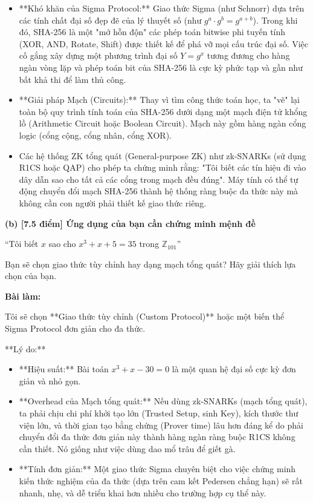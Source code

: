 \begin{itemize}
    \item **Khó khăn của Sigma Protocol:** Giao thức Sigma (như Schnorr) dựa trên các tính chất đại số đẹp đẽ của lý thuyết số (như $g^a \cdot g^b = g^{a+b}$). Trong khi đó, SHA-256 là một "mớ hỗn độn" các phép toán bitwise phi tuyến tính (XOR, AND, Rotate, Shift) được thiết kế để phá vỡ mọi cấu trúc đại số. Việc cố gắng xây dựng một phương trình đại số $Y = g^x$ tương đương cho hàng ngàn vòng lặp và phép toán bit của SHA-256 là cực kỳ phức tạp và gần như bất khả thi để làm thủ công.
    
    \item **Giải pháp Mạch (Circuits):** Thay vì tìm công thức toán học, ta "vẽ" lại toàn bộ quy trình tính toán của SHA-256 dưới dạng một mạch điện tử khổng lồ (Arithmetic Circuit hoặc Boolean Circuit). Mạch này gồm hàng ngàn cổng logic (cổng cộng, cổng nhân, cổng XOR).
    \item Các hệ thống ZK tổng quát (General-purpose ZK) như zk-SNARKs (sử dụng R1CS hoặc QAP) cho phép ta chứng minh rằng: "Tôi biết các tín hiệu đi vào dây dẫn sao cho tất cả các cổng trong mạch đều đúng". Máy tính có thể tự động chuyển đổi mạch SHA-256 thành hệ thống ràng buộc đa thức này mà không cần con người phải thiết kế giao thức riêng.
\end{itemize}

\textbf{(b) [7.5 điểm] Ứng dụng của bạn cần chứng minh mệnh đề}

``Tôi biết $x$ sao cho $x^3 + x + 5 = 35$ trong $\mathbb{Z}_{101}$''

Bạn sẽ chọn giao thức tùy chỉnh hay dạng mạch tổng quát?
Hãy giải thích lựa chọn của bạn.

\textbf{Bài làm:}

Tôi sẽ chọn **Giao thức tùy chỉnh (Custom Protocol)** hoặc một biến thể Sigma Protocol đơn giản cho đa thức.

**Lý do:**
\begin{itemize}
    \item **Hiệu suất:** Bài toán $x^3 + x - 30 = 0$ là một quan hệ đại số cực kỳ đơn giản và nhỏ gọn.
    \item **Overhead của Mạch tổng quát:** Nếu dùng zk-SNARKs (mạch tổng quát), ta phải chịu chi phí khởi tạo lớn (Trusted Setup, sinh Key), kích thước thư viện lớn, và thời gian tạo bằng chứng (Prover time) lâu hơn đáng kể do phải chuyển đổi đa thức đơn giản này thành hàng ngàn ràng buộc R1CS không cần thiết. Nó giống như việc dùng dao mổ trâu để giết gà.
    \item **Tính đơn giản:** Một giao thức Sigma chuyên biệt cho việc chứng minh kiến thức nghiệm của đa thức (dựa trên cam kết Pedersen chẳng hạn) sẽ rất nhanh, nhẹ, và dễ triển khai hơn nhiều cho trường hợp cụ thể này.
\end{itemize}
